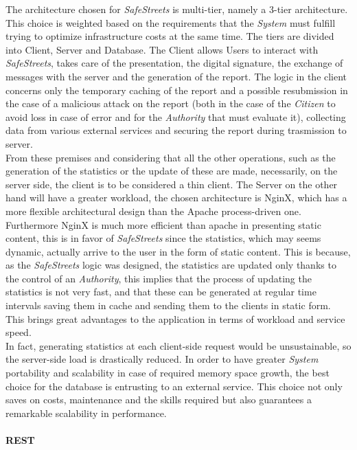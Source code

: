 \documentclass{article}
\begin{document}
The architecture chosen for \textit{SafeStreets} is multi-tier, namely a 3-tier architecture. 
This choice is weighted based on the requirements that the \textit{System} must fulfill trying 
to optimize infrastructure costs at the same time. The tiers are divided into Client, 
Server and Database. The Client allows Users to interact with \textit{SafeStreets}, takes care of 
the presentation, the digital signature, the exchange of messages with the server and the 
generation of the report. The logic in the client concerns only the temporary caching of 
the report and a possible resubmission in the case of a malicious attack on the report 
(both in the case of the \textit{Citizen} to avoid loss in case of error and for the \textit{Authority} 
that must evaluate it), collecting data from various external services and securing the 
report during trasmission to server. \\From these premises and considering that all the other 
operations, such as the generation of the statistics or the update of these are made, 
necessarily, on the server side, the client is to be considered a thin client. 
The Server on the other hand will have a greater workload, the chosen architecture is 
NginX, which has a more flexible architectural design than the Apache process-driven one. 
Furthermore NginX is much more efficient than apache in presenting static content, 
this is in favor of \textit{SafeStreets} since the statistics, which may seems dynamic, 
actually arrive to the user in the form of static content. This is because, as 
the \textit{SafeStreets} logic was designed, the statistics are updated only thanks to the 
control of an \textit{Authority}, this implies that the process of updating the statistics 
is not very fast, and that these can be generated at regular time intervals saving 
them in cache and sending them to the clients in static form. This brings great 
advantages to the application in terms of workload and service speed.\\ In fact, 
generating statistics at each client-side request would be unsustainable, so the 
server-side load is drastically reduced. In order to have greater \textit{System} portability and 
scalability in case of required memory space growth, the best choice for the database is 
entrusting to an external service. This choice not only saves on costs, maintenance and 
the skills required but also guarantees a remarkable scalability in performance.
\\
\\
\textbf{REST} \\
\end{document}

